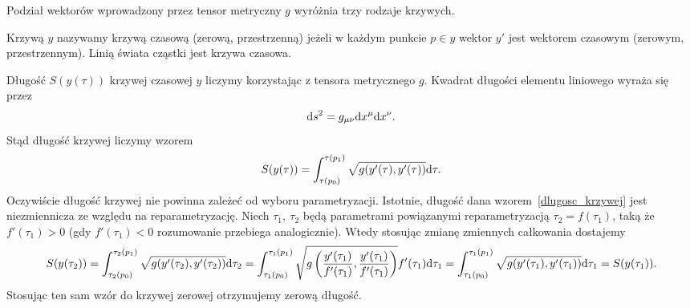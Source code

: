 Podział wektorów wprowadzony przez tensor metryczny $g$ 
wyróżnia trzy rodzaje krzywych. 
\begin{definition}
Krzywą $y$ nazywamy krzywą czasową (zerową, przestrzenną)
jeżeli w każdym punkcie $p \in y$ wektor $y'$ jest 
wektorem czasowym
(zerowym, przestrzennym). Linią świata cząstki
jest krzywa czasowa. 
\end{definition}
Długość $S(y(\tau))$ krzywej czasowej $y$ liczymy 
korzystając z tensora metrycznego $g$. 
Kwadrat długości elementu liniowego wyraża się przez
\begin{align}
\text{d} s^2 = g_{\mu\nu} \text{d} x^\mu \text{d} x^\nu.
\end{align}
Stąd długość krzywej liczymy wzorem
\begin{align}\label{dlugosc_krzywej}
S( y(\tau) ) = \int_{\tau(p_0)}^{\tau(p_1)} \sqrt{g (
y' (\tau), y' (\tau) )} \text{d} \tau.
\end{align}
Oczywiście 
długość krzywej nie powinna zależeć od wyboru parametryzacji.
Istotnie, długość dana wzorem~\eqref{dlugosc_krzywej}
jest niezmiennicza ze względu na reparametryzację.
Niech $\tau_1,\ \tau_2$ będą parametrami powiązanymi 
reparametryzacją $\tau_2 = f(\tau_1)$, taką że 
$f'(\tau_1) > 0$ (gdy $f'(\tau_1) <0$ rozumowanie 
przebiega analogicznie).
Wtedy stosując zmianę zmiennych całkowania dostajemy
\begin{align}
S(y(\tau_2)) = 
\int_{\tau_2(p_0)}^{\tau_2(p_1)} \sqrt{g (
y' (\tau_2), y' (\tau_2) )} \text{d} \tau_2  = 
\int_{\tau_1(p_0)}^{\tau_1(p_1)} \sqrt{g \left(
\frac{ y' (\tau_1) }{ f'(\tau_1)}, 
\frac{ y' (\tau_1) }{ f'(\tau_1)} \right)} 
f'(\tau_1) \text{d} \tau_1  = 
\int_{\tau_1(p_0)}^{\tau_1(p_1)} \sqrt{g (
y' (\tau_1), y' (\tau_1)  )} \text{d} \tau_1  
=S(y(\tau_1)).
\end{align}
Stosując ten sam wzór do krzywej zerowej otrzymujemy zerową
długość.

